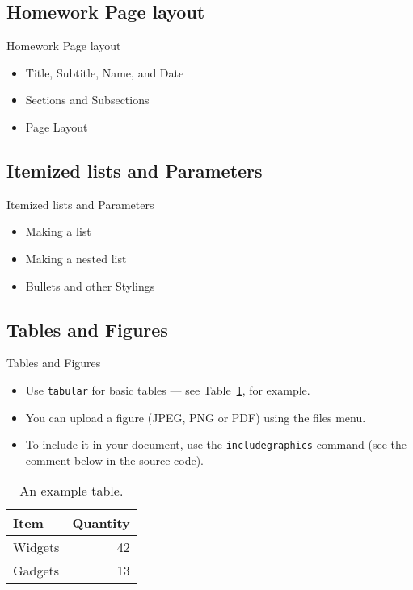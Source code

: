 \documentclass{beamer}
\begin{document}
\subsection{Homework Page layout}
\begin{frame}{Homework Page layout}
\begin{itemize}
  \item Title, Subtitle, Name, and Date
  \item Sections and Subsections
  \item Page Layout
\end{itemize}
\end{frame}

\subsection{Itemized lists and Parameters}
\begin{frame}{Itemized lists and Parameters}
\begin{itemize}
\item Making a list
\item Making a nested list
\item Bullets and other Stylings
\end{itemize}
\end{frame}

\subsection{Tables and Figures}

\begin{frame}{Tables and Figures}

\begin{itemize}
\item Use \texttt{tabular} for basic tables --- see Table~\ref{tab:widgets}, for example.
\item You can upload a figure (JPEG, PNG or PDF) using the files menu. 
\item To include it in your document, use the \texttt{includegraphics} command (see the comment below in the source code).
\end{itemize}


\begin{table}
\centering
\begin{tabular}{l|r}
Item & Quantity \\\hline
Widgets & 42 \\
Gadgets & 13
\end{tabular}
\caption{\label{tab:widgets}An example table.}
\end{table}

\end{frame}
\end{document}
